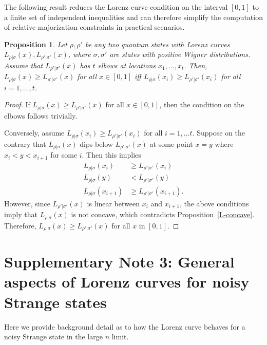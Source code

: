 \documentclass[
twocolumn,
superscriptaddress
]{revtex4-1}
\newtheorem{proposition}[theorem]{Proposition}
\begin{document}
The following result reduces the Lorenz curve condition on the interval $[0,1]$ to a finite set of independent inequalities and can therefore simplify the computation of relative majorization constraints in practical scenarios.
\begin{proposition}\label{thm:elbows}
	Let $\rho, \rho'$ be any two quantum states with Lorenz curves $L_{\rho|\sigma}(x), L_{\rho'|\sigma'}(x)$, where $\sigma, \sigma'$ are states with positive Wigner distributions. Assume that $L_{\rho'|\sigma'}(x)$ has $t$ elbows at locations $x_1, \dots, x_t$. Then, $L_{\rho|\sigma}(x) \geq L_{\rho'|\sigma'}(x)$ for all $x \in [0,1]$ iff $L_{\rho|\sigma}(x_{i}) \geq L_{\rho'|\sigma'}(x_{i})$ for all $i =1,\dots,t$.
\end{proposition}
\begin{proof}	
If $L_{\rho|\sigma}(x) \geq L_{\rho'|\sigma'}(x)$ for all $x \in [0,1]$, then the condition on the elbows follows trivially.

Conversely, assume $L_{\rho|\sigma}(x_i) \geq L_{\rho'|\sigma'}(x_i)$ for all $i=1,\dots t$. 
Suppose on the contrary that $L_{\rho|\sigma}(x)$ dips below $L_{\rho'|\sigma'}(x)$ at some point $x=y$ where $x_i < y < x_{i+1}$ for some $i$. Then this implies
\begin{align*}
L_{\rho|\sigma}(x_i) &\ge L_{\rho'|\sigma'}(x_i) \\
L_{\rho|\sigma}(y) & <L_{\rho'|\sigma'}(y) \\
L_{\rho|\sigma}(x_{i+1}) &\ge L_{\rho'|\sigma'}(x_{i+1}).
\end{align*}
However, since $L_{\rho'|\sigma'}(x)$ is linear between $x_i$ and $x_{i+1}$, the above conditions imply that $L_{\rho|\sigma}(x)$ is not concave, which contradicts Proposition~\ref{L-concave}.
Therefore, $L_{\rho|\sigma}(x) \geq L_{\rho'|\sigma'}(x)$ for all $x$ in $[0,1]$.
\end{proof}

\section*{Supplementary Note 3: General aspects of Lorenz curves for noisy Strange states}

Here we provide background detail as to how the Lorenz curve behaves for a noisy Strange state in the large $n$ limit.
\end{document}
